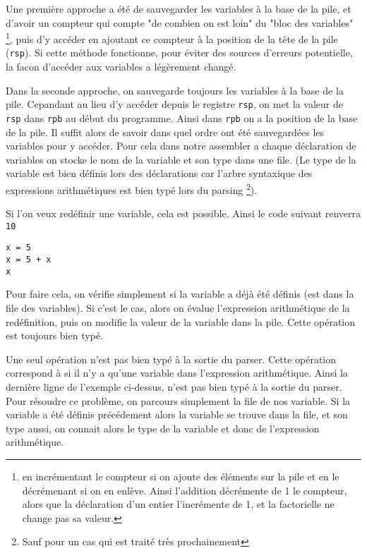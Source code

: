 \documentclass[12pt]{article}
\begin{document}
Une première approche a été de sauvegarder les variables à la base de la pile, et d'avoir un compteur qui compte "de combien on est loin" du 
"bloc des variables" 
\footnote{en incrémentant le compteur si on ajoute des éléments sur la pile et en le décrémenant si on en enlève. 
Ainsi l'addition décrémente de 1 le compteur, alors que la déclaration d'un entier l'incrémente de 1, et la factorielle ne change pas sa valeur.}, 
puis d'y accéder en ajoutant ce compteur à la position de la tête de la pile (\verb|rsp|). Si cette méthode fonctionne, pour
éviter des sources d'erreurs potentielle, la facon d'accéder aux variables a légèrement changé.

Dans la seconde approche, on sauvegarde toujours les variables à la base de la pile. Cepandant au lieu d'y accéder depuis le registre 
\verb|rsp|, on met la valeur de \verb|rsp| dans \verb|rpb| au début du programme. Ainsi dans \verb|rpb| on a la position de la base de la pile. Il 
suffit alors de savoir dans quel ordre ont été sauvegardées les variables pour y accéder.
Pour cela dans notre assembler a chaque déclaration de variables on stocke le nom de la variable et son type dans une file.
(Le type de la variable est bien définis lors des déclarations car l'arbre syntaxique des expressions arithmétiques est bien typé 
lors du parsing \footnote{Sauf pour un cas qui est traité très prochainement}).

Si l'on veux redéfinir une variable, cela est possible. Ainsi le code suivant renverra \verb|10|
\begin{verbatim}
x = 5
x = 5 + x
x
\end{verbatim}

Pour faire cela, on vérifie simplement si la variable a déjà été définis (est dans la file des variables).
Si c'est le cas, alors on évalue l'expression arithmétique de la redéfinition, puis on modifie la valeur de la variable dans la pile.
Cette opération est toujours bien typé.


Une seul opération n'est pas bien typé à la sortie du parser. Cette opération correspond à si il n'y a qu'une variable dans l'expression 
arithmétique. Ainsi la dernière ligne de l'exemple ci-dessus, n'est pas bien typé à la sortie du parser. Pour résoudre ce problème,
on parcours simplement la file de nos variable. Si la variable a été définis précédement alors la variable se trouve dans la file,
et son type aussi, on connait alors le type de la variable et donc de l'expression arithmétique.
\end{document}
